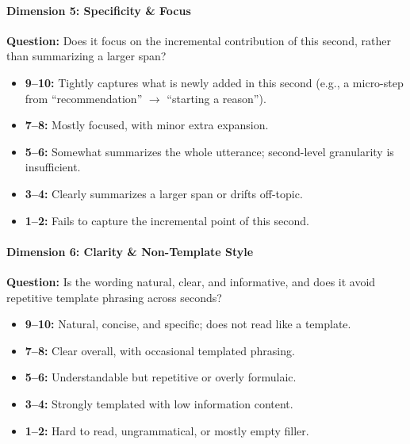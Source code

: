 \paragraph{Dimension 5: Specificity \& Focus}
\textbf{Question:} Does it focus on the incremental contribution of this second, rather than summarizing a larger span?
\begin{itemize}
  \item \textbf{9--10:} Tightly captures what is newly added in this second (e.g., a micro-step from ``recommendation'' $\rightarrow$ ``starting a reason'').
  \item \textbf{7--8:} Mostly focused, with minor extra expansion.
  \item \textbf{5--6:} Somewhat summarizes the whole utterance; second-level granularity is insufficient.
  \item \textbf{3--4:} Clearly summarizes a larger span or drifts off-topic.
  \item \textbf{1--2:} Fails to capture the incremental point of this second.
\end{itemize}

\paragraph{Dimension 6: Clarity \& Non-Template Style}
\textbf{Question:} Is the wording natural, clear, and informative, and does it avoid repetitive template phrasing across seconds?
\begin{itemize}
  \item \textbf{9--10:} Natural, concise, and specific; does not read like a template.
  \item \textbf{7--8:} Clear overall, with occasional templated phrasing.
  \item \textbf{5--6:} Understandable but repetitive or overly formulaic.
  \item \textbf{3--4:} Strongly templated with low information content.
  \item \textbf{1--2:} Hard to read, ungrammatical, or mostly empty filler.
\end{itemize}

